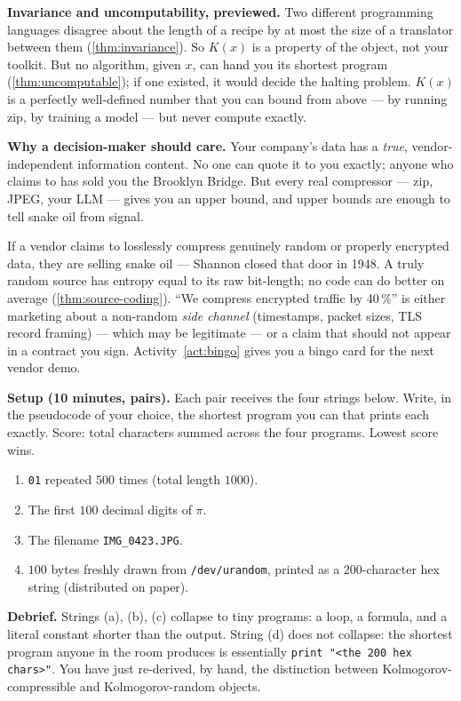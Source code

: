 \begin{intuition}
\textbf{Invariance and uncomputability, previewed.}  Two different
programming languages disagree about the length of a recipe by at most
the size of a translator between them (\cref{thm:invariance}).  So
$K(x)$ is a property of the object, not your toolkit.  But no
algorithm, given $x$, can hand you its shortest program
(\cref{thm:uncomputable}); if one existed, it would decide the halting
problem.  $K(x)$ is a perfectly well-defined number that you can bound
from above --- by running zip, by training a model --- but never
compute exactly.

\textbf{Why a decision-maker should care.}  Your company's data has a
\emph{true}, vendor-independent information content.  No one can quote
it to you exactly; anyone who claims to has sold you the Brooklyn
Bridge.  But every real compressor --- zip, JPEG, your LLM --- gives
you an upper bound, and upper bounds are enough to tell snake oil from
signal.
\end{intuition}

\begin{intuition}[title={The compression sniff test}]
If a vendor claims to losslessly compress genuinely random or properly
encrypted data, they are selling snake oil --- Shannon closed that
door in 1948.  A truly random source has entropy equal to its raw
bit-length; no code can do better on average
(\cref{thm:source-coding}).  ``We compress encrypted traffic by
40\,\%'' is either marketing about a non-random \emph{side channel}
(timestamps, packet sizes, TLS record framing) --- which may be
legitimate --- or a claim that should not appear in a contract you
sign.  Activity~\ref{act:bingo} gives you a bingo card for the next
vendor demo.
\end{intuition}

\begin{activity}[title={Activity 1 --- Shortest-recipe game}]
\label{act:recipe}
\textbf{Setup (10 minutes, pairs).}  Each pair receives the four
strings below.  Write, in the pseudocode of your choice, the shortest
program you can that prints each exactly.  Score: total characters
summed across the four programs.  Lowest score wins.

\begin{enumerate}[label=(\alph*),leftmargin=*]
  \item \texttt{01} repeated $500$ times (total length $1000$).
  \item The first $100$ decimal digits of $\pi$.
  \item The filename \texttt{IMG\_0423.JPG}.
  \item $100$ bytes freshly drawn from \texttt{/dev/urandom},
        printed as a $200$-character hex string (distributed on paper).
\end{enumerate}

\textbf{Debrief.}  Strings (a), (b), (c) collapse to tiny programs: a
loop, a formula, and a literal constant shorter than the output.
String (d) does not collapse: the shortest program anyone in the room
produces is essentially \texttt{print "<the 200 hex chars>"}.  You
have just re-derived, by hand, the distinction between
Kolmogorov-compressible and Kolmogorov-random objects.
\end{activity}


